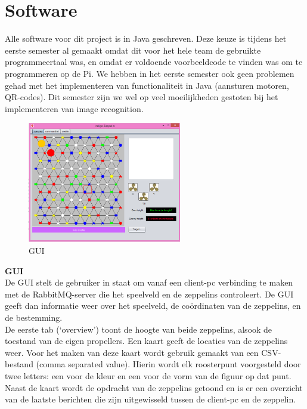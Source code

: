 \documentclass[tt]{penoverslag}
\begin{document}
\section{Software}

Alle software voor dit project is in Java geschreven. Deze keuze is tijdens het eerste semester al gemaakt omdat dit voor het hele team de gebruikte programmeertaal was, en omdat er voldoende voorbeeldcode te vinden was om te programmeren op de Pi. We hebben in het eerste semester ook geen problemen gehad met het implementeren van functionaliteit in Java (aansturen motoren, QR-codes). Dit semester zijn we wel op veel moeilijkheden gestoten bij het implementeren van image recognition. \\

\begin{figure}[H]
\begin{center}
\includegraphics[width=0.6\textwidth]{GUI.png}
\end{center}
\caption{GUI}
\label{GUI}
\end{figure}

\textbf{GUI} \\
De GUI stelt de gebruiker in staat om vanaf een client-pc verbinding te maken met de RabbitMQ-server die het speelveld en de zeppelins controleert. De GUI geeft dan informatie weer over het speelveld, de co\"{o}rdinaten van de zeppelins, en de bestemming.  \\

De eerste tab (`overview') toont de hoogte van beide zeppelins, alsook de toestand van de eigen propellers. Een kaart geeft de locaties van de zeppelins weer. Voor het maken van deze kaart wordt gebruik gemaakt van een CSV-bestand (comma separated value). Hierin wordt elk roosterpunt voorgesteld door twee letters: een voor de kleur en een voor de vorm van de figuur op dat punt. Naast de kaart wordt de opdracht van de zeppelins getoond en is er een overzicht van de laatste berichten die zijn uitgewisseld tussen de client-pc en de zeppelin. \\
\end{document}
